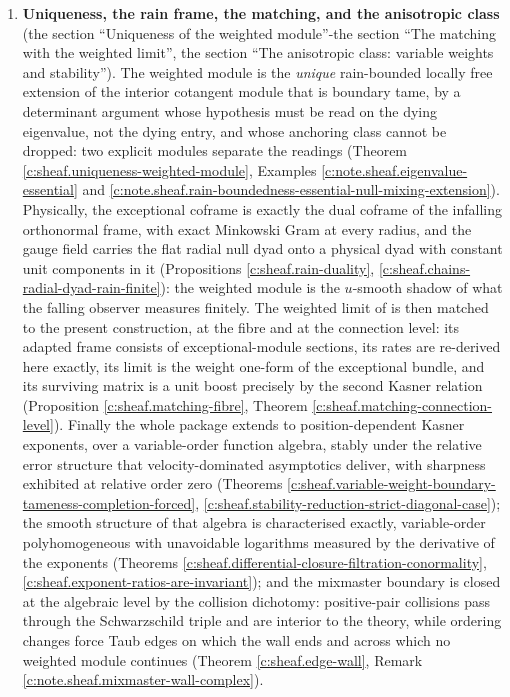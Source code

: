 \documentclass[11pt]{article}
\theoremstyle{definition}
\theoremstyle{plain}
\begin{document}
\begin{enumerate}
\item \textbf{Uniqueness, the rain frame, the matching, and the anisotropic class} (the section ``Uniqueness of the weighted module''-the section ``The matching with the weighted limit'', the section ``The anisotropic class: variable weights and stability''). The weighted module is the \emph{unique} rain-bounded locally free extension of the interior cotangent module that is boundary tame, by a determinant argument whose hypothesis must be read on the dying eigenvalue, not the dying entry, and whose anchoring class cannot be dropped: two explicit modules separate the readings (Theorem \ref{c:sheaf.uniqueness-weighted-module}, Examples \ref{c:note.sheaf.eigenvalue-essential} and \ref{c:note.sheaf.rain-boundedness-essential-null-mixing-extension}). Physically, the exceptional coframe is exactly the dual coframe of the infalling orthonormal frame, with exact Minkowski Gram at every radius, and the gauge field carries the flat radial null dyad onto a physical dyad with constant unit components in it (Propositions \ref{c:sheaf.rain-duality}, \ref{c:sheaf.chains-radial-dyad-rain-finite}): the weighted module is the $u$-smooth shadow of what the falling observer measures finitely. The weighted limit of \cite{ButlerT6} is then matched to the present construction, at the fibre and at the connection level: its adapted frame consists of exceptional-module sections, its rates are re-derived here exactly, its limit is the weight one-form of the exceptional bundle, and its surviving matrix is a unit boost precisely by the second Kasner relation (Proposition \ref{c:sheaf.matching-fibre}, Theorem \ref{c:sheaf.matching-connection-level}). Finally the whole package extends to position-dependent Kasner exponents, over a variable-order function algebra, stably under the relative error structure that velocity-dominated asymptotics deliver, with sharpness exhibited at relative order zero (Theorems \ref{c:sheaf.variable-weight-boundary-tameness-completion-forced}, \ref{c:sheaf.stability-reduction-strict-diagonal-case}); the smooth structure of that algebra is characterised exactly, variable-order polyhomogeneous with unavoidable logarithms measured by the derivative of the exponents (Theorems \ref{c:sheaf.differential-closure-filtration-conormality}, \ref{c:sheaf.exponent-ratios-are-invariant}); and the mixmaster boundary is closed at the algebraic level by the collision dichotomy: positive-pair collisions pass through the Schwarzschild triple and are interior to the theory, while ordering changes force Taub edges on which the wall ends and across which no weighted module continues (Theorem \ref{c:sheaf.edge-wall}, Remark \ref{c:note.sheaf.mixmaster-wall-complex}).

\end{enumerate}
\end{document}
